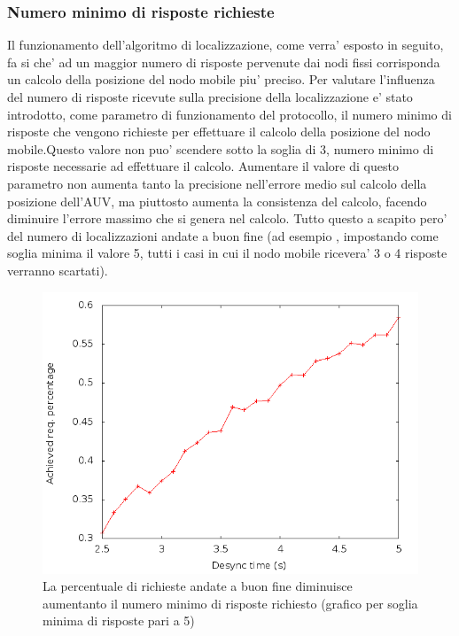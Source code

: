 \subsubsection{Numero minimo di risposte richieste}
Il funzionamento dell'algoritmo di localizzazione, come verra' esposto in seguito, fa si che' ad un maggior numero di risposte pervenute dai nodi fissi corrisponda un calcolo della posizione del nodo mobile piu' preciso.\newline
Per valutare l'influenza del numero di risposte ricevute sulla precisione della localizzazione e' stato introdotto, come parametro di funzionamento del protocollo, il numero minimo di risposte che vengono richieste per effettuare il calcolo della posizione del nodo mobile.\newline Questo valore non puo' scendere sotto la soglia di 3, numero minimo di risposte necessarie ad effettuare il calcolo.\newline 
Aumentare il valore di questo parametro non aumenta tanto la precisione nell'errore medio sul calcolo della posizione dell'AUV, ma piuttosto aumenta la consistenza del calcolo, facendo diminuire l'errore massimo che si genera nel calcolo. Tutto questo a scapito pero' del numero di localizzazioni andate a buon fine (ad esempio , impostando come soglia minima il valore 5, tutti i casi in cui il nodo mobile ricevera' 3 o 4  risposte verranno scartati).\newline
\begin{figure}[H]
    \centering
    \includegraphics[scale=0.5]{achievedlochexagon6nodescutoff4req5preempt0droponepoint0speed1.png}
    \caption{La percentuale di richieste andate a buon fine diminuisce aumentanto il numero minimo di risposte richiesto (grafico per soglia minima di risposte pari a 5)}
\end{figure}

